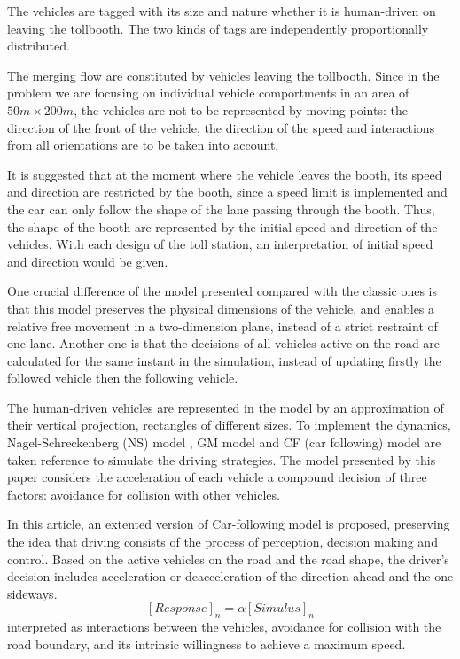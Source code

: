 \documentclass{mcmthesis}
\begin{document}
The vehicles are tagged with its size and nature whether it is human-driven on leaving the tollbooth. The two kinds of tags are independently proportionally distributed.

The merging flow are constituted by vehicles leaving the tollbooth. Since in the problem we are focusing on individual vehicle comportments in an area of $50m\times200m$, the vehicles are not to be represented by moving points: the direction of the front of the vehicle, the direction of the speed and interactions from all orientations are to be taken into account.

It is suggested that at the moment where the vehicle leaves the booth, its speed and direction are restricted by the booth, since a speed limit is implemented and the car can only follow the shape of the lane passing through the booth. Thus, the shape of the booth are represented by the initial speed and direction of the vehicles. With each design of the toll station, an interpretation of initial speed and direction would be given.

One crucial difference of the model presented compared with the classic ones is that this model preserves the physical dimensions of the vehicle, and enables a relative free movement in a two-dimension plane, instead of a strict restraint of one lane. Another one is that the decisions of all vehicles active on the road are calculated for the same instant in the simulation, instead of updating firstly the followed vehicle then the following vehicle.

The human-driven vehicles are represented in the model by an approximation of their vertical projection, rectangles of different sizes. To implement the dynamics, Nagel-Schreckenberg (NS) model \cite{acelluar}, GM model and CF (car following) model are taken reference to simulate the driving strategies. The model presented by this paper considers the acceleration of each vehicle a compound decision of three factors: avoidance for collision with other vehicles.


In this article, an extented version of Car-following model is proposed, preserving the idea that driving consists of the process of perception, decision making and control. Based on the active vehicles on the road and the road shape, the driver's decision includes acceleration or deacceleration of the direction ahead and the one sideways.
$$[Response]_n= \alpha [Simulus]_n$$
 interpreted as interactions between the vehicles, avoidance for collision with the road boundary, and its intrinsic willingness to achieve a maximum speed. 
\end{document}
